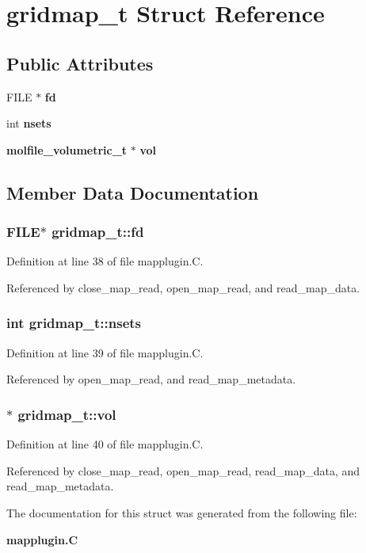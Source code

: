 \section{gridmap\_\-t  Struct Reference}
\label{structgridmap__t}
\subsection*{Public Attributes}
\begin{CompactItemize}
\item 
FILE $\ast$ {\bf fd}
\item 
int {\bf nsets}
\item 
{\bf molfile\_\-volumetric\_\-t} $\ast$ {\bf vol}
\end{CompactItemize}


\subsection{Member Data Documentation}
\subsubsection{\setlength{\rightskip}{0pt plus 5cm}FILE$\ast$ gridmap\_\-t::fd}\label{structgridmap__t_m0}




Definition at line 38 of file mapplugin.C.

Referenced by close\_\-map\_\-read, open\_\-map\_\-read, and read\_\-map\_\-data.
\subsubsection{\setlength{\rightskip}{0pt plus 5cm}int gridmap\_\-t::nsets}\label{structgridmap__t_m1}




Definition at line 39 of file mapplugin.C.

Referenced by open\_\-map\_\-read, and read\_\-map\_\-metadata.
\subsubsection{$\ast$ gridmap\_\-t::vol}\label{structgridmap__t_m2}




Definition at line 40 of file mapplugin.C.

Referenced by close\_\-map\_\-read, open\_\-map\_\-read, read\_\-map\_\-data, and read\_\-map\_\-metadata.

The documentation for this struct was generated from the following file:\begin{CompactItemize}
\item 
{\bf mapplugin.C}\end{CompactItemize}
